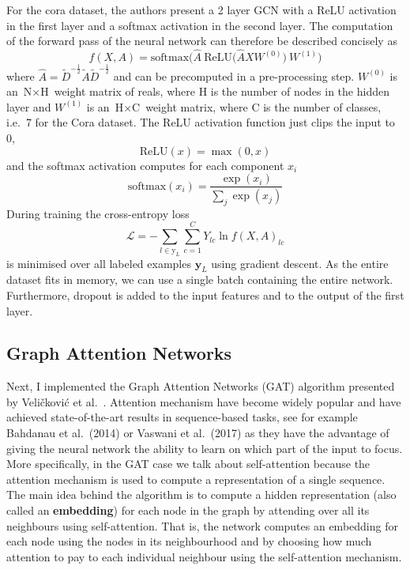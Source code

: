 \documentclass[12pt]{article}
\theoremstyle{definition}
\begin{document}
For the cora dataset, the authors present a 2 layer GCN with a ReLU activation in the first layer and a softmax activation in the second layer. The computation of the forward pass of the neural network can therefore be described concisely as
\[
f(X,A) = \textrm{softmax}\big(\hat{A}\ \textrm{ReLU}\big( \hat{A} X W^{(0)} \big)\ W^{(1)} \big)
\]
where $\hat{A} = \tilde{D}^{-\frac{1}{2}} \tilde{A} \tilde{D}^{-\frac{1}{2}}$ and can be precomputed in a pre-processing step. $W^{(0)}$ is an $\textrm{N} \times \textrm{H}$ weight matrix of reals, where H is the number of nodes in the hidden layer and $W^{(1)}$ is an $\textrm{H} \times \textrm{C}$ weight matrix, where C is the number of classes, i.e.\ 7  for the Cora dataset. The ReLU activation function just clips the input to 0,
\[
\textrm{ReLU}(x) = \max(0, x)
\]
and the softmax activation computes for each component $x_i$
\[
\textrm{softmax}(x_i) = \frac{\exp(x_i)}{\sum_j \exp(x_j)}
\]
During training the cross-entropy loss 
\[
\mathcal{L} = - \sum_{l \in \textrm{y}_L} \sum_{c=1}^{C} Y_{lc} \ln f(X,A)_{lc}
\]
is minimised over all labeled examples $\textbf{y}_L$ using gradient descent. As the entire dataset fits in memory, we can use a single batch containing the entire network. Furthermore, dropout \cite{srivastava2014dropout} is added to the input features and to the output of the first layer.

\subsection{Graph Attention Networks}
Next, I implemented the Graph Attention Networks (GAT) algorithm presented by Veli{\v{c}}kovi{\'{c}} et al.\ \cite{velickovic2018graph}. Attention mechanism have become widely popular and have achieved state-of-the-art results in sequence-based tasks, see for example Bahdanau et al.\ (2014) \cite{bahdanau2014neural} or Vaswani et al.\ (2017) \cite{vaswani2017attention} as they have the advantage of giving the neural network the ability to learn on which part of the input to focus. More specifically, in the GAT case we talk about self-attention because the attention mechanism is used to compute a representation of a single sequence. The main idea behind the algorithm is to compute a hidden representation (also called an \textbf{embedding}) for each node in the graph by attending over all its neighbours using self-attention. That is, the network computes an embedding for each node using the nodes in its neighbourhood and by choosing how much attention to pay to each individual neighbour using the self-attention mechanism.
\end{document}

